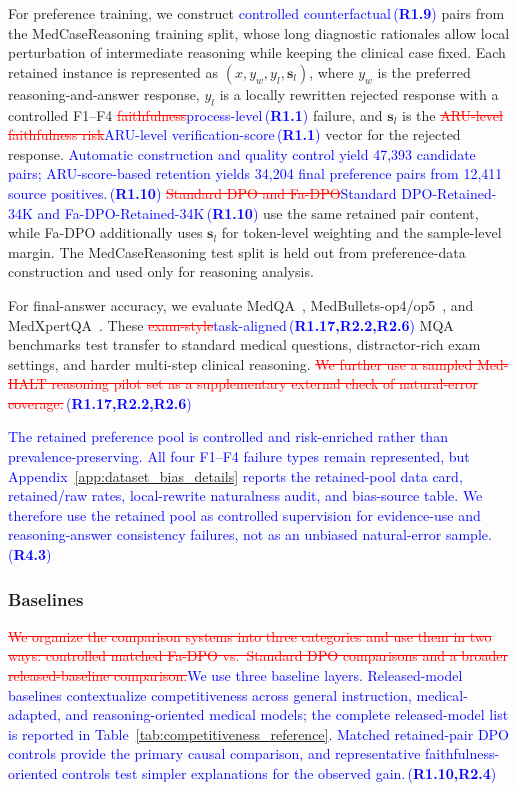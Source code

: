 \documentclass[a4paper,fleqn,doubleblind]{cas-sc}
\DeclareRobustCommand{\deleted}[1]{\textcolor{red}{\sout{#1}}}
\DeclareRobustCommand{\added}[1]{\textcolor{blue}{#1}}
\DeclareRobustCommand{\revtag}[1]{\textcolor{blue}{\scriptsize\,(\textbf{#1})}}
\begin{document}
For preference training, we construct \added{controlled counterfactual}\revtag{R1.9} pairs from the MedCaseReasoning training split, whose long diagnostic rationales allow local perturbation of intermediate reasoning while keeping the clinical case fixed. Each retained instance is represented as $(x, y_w, y_l, \mathbf{s}_l)$, where $y_w$ is the preferred reasoning-and-answer response, $y_l$ is a locally rewritten rejected response with a controlled F1--F4 \deleted{faithfulness}\added{process-level}\revtag{R1.1} failure, and $\mathbf{s}_l$ is the \deleted{ARU-level faithfulness risk}\added{ARU-level verification-score}\revtag{R1.1} vector for the rejected response. \added{Automatic construction and quality control yield 47,393 candidate pairs; ARU-score-based retention yields 34,204 final preference pairs from 12,411 source positives.}\revtag{R1.10} \deleted{Standard DPO and Fa-DPO}\added{Standard DPO-Retained-34K and Fa-DPO-Retained-34K}\revtag{R1.10} use the same retained pair content, while Fa-DPO additionally uses $\mathbf{s}_l$ for token-level weighting and the sample-level margin. The MedCaseReasoning test split is held out from preference-data construction and used only for reasoning analysis.

For final-answer accuracy, we evaluate MedQA~\cite{jin2021disease}, MedBullets-op4/op5~\cite{chen2025benchmarking}, and MedXpertQA~\cite{zuo2025medxpertqa}. These \deleted{exam-style}\added{task-aligned}\revtag{R1.17,R2.2,R2.6} MQA benchmarks test transfer to standard medical questions, distractor-rich exam settings, and harder multi-step clinical reasoning. \deleted{We further use a sampled Med-HALT reasoning pilot set as a supplementary external check of natural-error coverage.}\revtag{R1.17,R2.2,R2.6}

\added{The retained preference pool is controlled and risk-enriched rather than prevalence-preserving. All four F1--F4 failure types remain represented, but Appendix~\ref{app:dataset_bias_details} reports the retained-pool data card, retained/raw rates, local-rewrite naturalness audit, and bias-source table. We therefore use the retained pool as controlled supervision for evidence-use and reasoning-answer consistency failures, not as an unbiased natural-error sample.}\revtag{R4.3}

\subsubsection{Baselines}

\deleted{We organize the comparison systems into three categories and use them in two ways: controlled matched Fa-DPO vs.\ Standard DPO comparisons and a broader released-baseline comparison.}\added{We use three baseline layers. Released-model baselines contextualize competitiveness across general instruction, medical-adapted, and reasoning-oriented medical models; the complete released-model list is reported in Table~\ref{tab:competitiveness_reference}. Matched retained-pair DPO controls provide the primary causal comparison, and representative faithfulness-oriented controls test simpler explanations for the observed gain.}\revtag{R1.10,R2.4}
\end{document}

